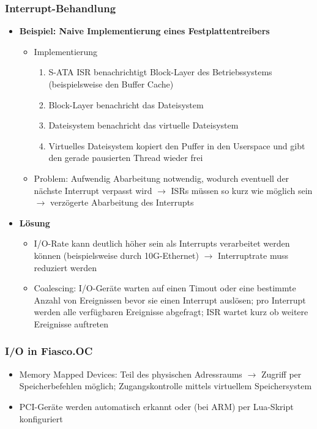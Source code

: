 \subsubsection{Interrupt-Behandlung}
\begin{itemize}
	\item \textbf{Beispiel: Naive Implementierung eines Festplattentreibers}
	\begin{itemize}
		\item Implementierung
		\begin{enumerate}
			\item S-ATA ISR benachrichtigt Block-Layer des Betriebssystems (beispielsweise den Buffer Cache)
			\item Block-Layer benachricht das Dateisystem
			\item Dateisystem benachricht das virtuelle Dateisystem
			\item Virtuelles Dateisystem kopiert den Puffer in den Userspace und gibt den gerade pausierten Thread wieder frei
		\end{enumerate}
		\item Problem: Aufwendig Abarbeitung notwendig, wodurch eventuell der nächste Interrupt verpasst wird \(\rightarrow\) ISRs müssen so kurz wie möglich sein \(\rightarrow\) verzögerte Abarbeitung des Interrupts
	\end{itemize}
	\item \textbf{Lösung}
	\begin{itemize}
		\item I/O-Rate kann deutlich höher sein als Interrupts verarbeitet werden können (beispielsweise durch 10G-Ethernet) \(\rightarrow\) Interruptrate muss reduziert werden
		\item Coalescing: I/O-Geräte warten auf einen Timout oder eine bestimmte Anzahl von Ereignissen bevor sie einen Interrupt auslösen; pro Interrupt werden alle verfügbaren Ereignisse abgefragt; ISR wartet kurz ob weitere Ereignisse auftreten
	\end{itemize}
\end{itemize}

\subsubsection{I/O in Fiasco.OC}
\begin{itemize}
	\item Memory Mapped Devices: Teil des physischen Adressraums \(\rightarrow\) Zugriff per Speicherbefehlen möglich; Zugangskontrolle mittels virtuellem Speichersystem
	\item PCI-Geräte werden automatisch erkannt oder (bei ARM) per Lua-Skript konfiguriert
\end{itemize}



















